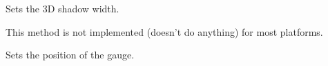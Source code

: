 
Sets the 3D shadow width.


This method is not implemented (doesn't do anything) for most platforms.


\label{wxgaugesetvalue}


Sets the position of the gauge.






